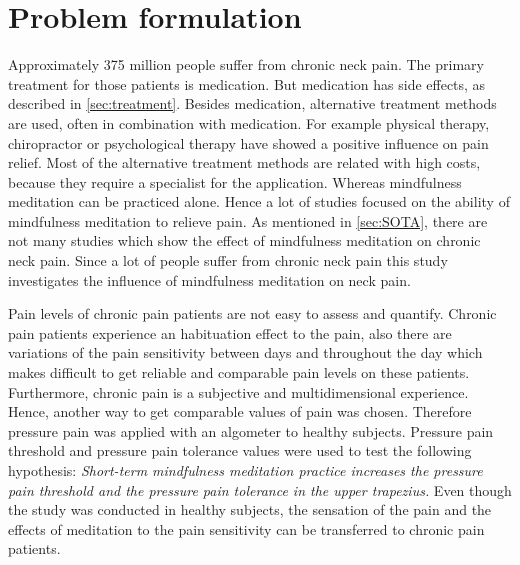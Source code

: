 \chapter{Problem formulation}

Approximately 375 million people suffer from chronic neck pain. The primary treatment for those patients is medication. But medication has side effects, as described in \ref{sec:treatment}.  Besides medication, alternative treatment methods are used, often in combination with medication. For example physical therapy, chiropractor or psychological therapy have showed a positive influence on pain relief. Most of the alternative treatment methods are related with high costs, because they require a specialist for the application. Whereas mindfulness meditation can be practiced alone. Hence a lot of studies focused on the ability of mindfulness meditation to relieve pain.
As mentioned in \ref{sec:SOTA}, there are not many studies which show the effect of mindfulness meditation on chronic neck pain. Since a lot of people suffer from chronic neck pain this study investigates the influence of mindfulness meditation on neck pain. 


Pain levels of chronic pain patients are not easy to assess and quantify. Chronic pain patients experience an habituation effect to the pain, also there are variations of the pain sensitivity between days and throughout the day which makes difficult to get reliable and comparable pain levels on these patients. Furthermore, chronic pain is a subjective and multidimensional experience.
Hence, another way to get comparable values of pain was chosen. Therefore pressure pain was applied with an algometer to healthy subjects. Pressure pain threshold and pressure pain tolerance values were used to test the following hypothesis:
\textit{Short-term mindfulness meditation practice increases the pressure pain threshold and the pressure pain tolerance in the upper trapezius.}
Even though the study was conducted in healthy subjects, the sensation of the pain and the effects of meditation to the pain sensitivity can be transferred to chronic pain patients.


